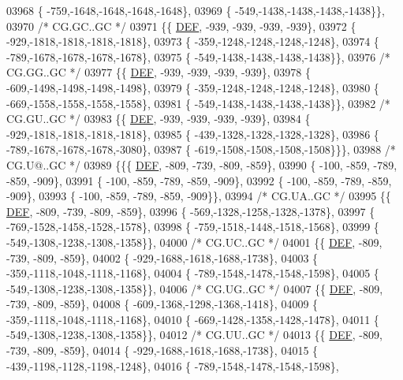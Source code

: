 \begin{DoxyCode}
03968 \{ -759,-1648,-1648,-1648,-1648\},
03969 \{ -549,-1438,-1438,-1438,-1438\}\},
03970 \textcolor{comment}{/* CG.GC..GC */}
03971 \{\{  \mbox{\hyperlink{1_88_84__epars_8h_a397419fc12b37ed479c8abb9d444d843}{DEF}}, -939, -939, -939, -939\},
03972 \{ -929,-1818,-1818,-1818,-1818\},
03973 \{ -359,-1248,-1248,-1248,-1248\},
03974 \{ -789,-1678,-1678,-1678,-1678\},
03975 \{ -549,-1438,-1438,-1438,-1438\}\},
03976 \textcolor{comment}{/* CG.GG..GC */}
03977 \{\{  \mbox{\hyperlink{1_88_84__epars_8h_a397419fc12b37ed479c8abb9d444d843}{DEF}}, -939, -939, -939, -939\},
03978 \{ -609,-1498,-1498,-1498,-1498\},
03979 \{ -359,-1248,-1248,-1248,-1248\},
03980 \{ -669,-1558,-1558,-1558,-1558\},
03981 \{ -549,-1438,-1438,-1438,-1438\}\},
03982 \textcolor{comment}{/* CG.GU..GC */}
03983 \{\{  \mbox{\hyperlink{1_88_84__epars_8h_a397419fc12b37ed479c8abb9d444d843}{DEF}}, -939, -939, -939, -939\},
03984 \{ -929,-1818,-1818,-1818,-1818\},
03985 \{ -439,-1328,-1328,-1328,-1328\},
03986 \{ -789,-1678,-1678,-1678,-3080\},
03987 \{ -619,-1508,-1508,-1508,-1508\}\}\},
03988 \textcolor{comment}{/* CG.U@..GC */}
03989 \{\{\{  \mbox{\hyperlink{1_88_84__epars_8h_a397419fc12b37ed479c8abb9d444d843}{DEF}}, -809, -739, -809, -859\},
03990 \{ -100, -859, -789, -859, -909\},
03991 \{ -100, -859, -789, -859, -909\},
03992 \{ -100, -859, -789, -859, -909\},
03993 \{ -100, -859, -789, -859, -909\}\},
03994 \textcolor{comment}{/* CG.UA..GC */}
03995 \{\{  \mbox{\hyperlink{1_88_84__epars_8h_a397419fc12b37ed479c8abb9d444d843}{DEF}}, -809, -739, -809, -859\},
03996 \{ -569,-1328,-1258,-1328,-1378\},
03997 \{ -769,-1528,-1458,-1528,-1578\},
03998 \{ -759,-1518,-1448,-1518,-1568\},
03999 \{ -549,-1308,-1238,-1308,-1358\}\},
04000 \textcolor{comment}{/* CG.UC..GC */}
04001 \{\{  \mbox{\hyperlink{1_88_84__epars_8h_a397419fc12b37ed479c8abb9d444d843}{DEF}}, -809, -739, -809, -859\},
04002 \{ -929,-1688,-1618,-1688,-1738\},
04003 \{ -359,-1118,-1048,-1118,-1168\},
04004 \{ -789,-1548,-1478,-1548,-1598\},
04005 \{ -549,-1308,-1238,-1308,-1358\}\},
04006 \textcolor{comment}{/* CG.UG..GC */}
04007 \{\{  \mbox{\hyperlink{1_88_84__epars_8h_a397419fc12b37ed479c8abb9d444d843}{DEF}}, -809, -739, -809, -859\},
04008 \{ -609,-1368,-1298,-1368,-1418\},
04009 \{ -359,-1118,-1048,-1118,-1168\},
04010 \{ -669,-1428,-1358,-1428,-1478\},
04011 \{ -549,-1308,-1238,-1308,-1358\}\},
04012 \textcolor{comment}{/* CG.UU..GC */}
04013 \{\{  \mbox{\hyperlink{1_88_84__epars_8h_a397419fc12b37ed479c8abb9d444d843}{DEF}}, -809, -739, -809, -859\},
04014 \{ -929,-1688,-1618,-1688,-1738\},
04015 \{ -439,-1198,-1128,-1198,-1248\},
04016 \{ -789,-1548,-1478,-1548,-1598\},

\end{DoxyCode}
